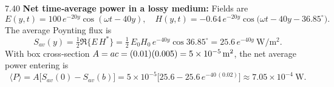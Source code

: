 \begin{chatbox}
\item[7.40] \textbf{Net time‐average power in a lossy medium:}  
Fields are  
\[
E(y,t)=100\,e^{-20y}\cos(\omega t-40y),\quad
H(y,t)=-0.64\,e^{-20y}\cos\bigl(\omega t-40y-36.85^\circ\bigr).
\]
The average Poynting flux is  
\[
S_{av}(y)
=\tfrac12\Re\{E\,H^*\}
=\tfrac12\,E_0H_0\,e^{-40y}\cos36.85^\circ
=25.6\,e^{-40y}\ \mathrm{W/m^2}.
\]
With box cross‐section $A=ac=(0.01)(0.005)=5\times10^{-5}\rm\,m^2$, the net average power entering is  
\[
\langle P\rangle
=A\bigl[S_{av}(0)-S_{av}(b)\bigr]
=5\times10^{-5}\bigl[25.6-25.6\,e^{-40\,(0.02)}\bigr]
\approx7.05\times10^{-4}\ \mathrm{W}.
\]

\end{chatbox}
